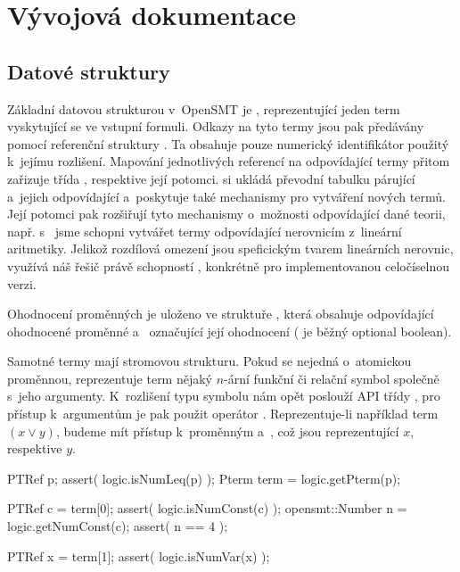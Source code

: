 \chapter{Vývojová dokumentace}

\section{Datové struktury}\label{data}

Základní datovou strukturou v~OpenSMT je , reprezentující jeden term vyskytující se ve vstupní formuli. Odkazy na tyto termy jsou pak předávány pomocí referenční struktury . Ta obsahuje pouze numerický identifikátor použitý k~jejímu rozlišení. Mapování jednotlivých referencí na odpovídající termy přitom zařizuje třída , respektive její potomci.  si ukládá převodní tabulku párující  a~jejich odpovídající  a~poskytuje také mechanismy pro vytváření nových termů. Její potomci pak rozšiřují tyto mechanismy o~možnosti odpovídající dané teorii, např. s~ jsme schopni vytvářet termy odpovídající nerovnicím z~lineární aritmetiky. Jelikož rozdílová omezení jsou speficickým tvarem lineárních nerovnic, využívá náš řešič právě schopností , konkrétně  pro implementovanou celočíselnou verzi.

Ohodnocení proměnných je uloženo ve struktuře , která obsahuje  odpovídající ohodnocené proměnné a~ označující její ohodnocení ( je běžný optional boolean).

Samotné termy mají stromovou strukturu. Pokud se nejedná o~atomickou proměnnou, reprezentuje term nějaký $n$-ární funkční či relační symbol společně s~jeho argumenty. K~rozlišení typu symbolu nám opět poslouží API třídy , pro přístup k~argumentům je pak použit operátor \icode{[]}. Reprezentuje-li například  term $(x \lor y)$, budeme mít přístup k~proměnným  a~, což jsou  reprezentující $x$, respektive $y$. 

\begin{code}[commandchars=\\\{\}, codes={\catcode`+=3}, label=Příklad práce s termem p $\approx (4 \leq x)$]
PTRef p;    
assert( logic.isNumLeq(p) );
Pterm term = logic.getPterm(p);

PTRef c = term[0];
assert( logic.isNumConst(c) );
opensmt::Number n = logic.getNumConst(c);
assert( n == 4 );

PTRef x = term[1];
assert( logic.isNumVar(x) );
\end{code}

